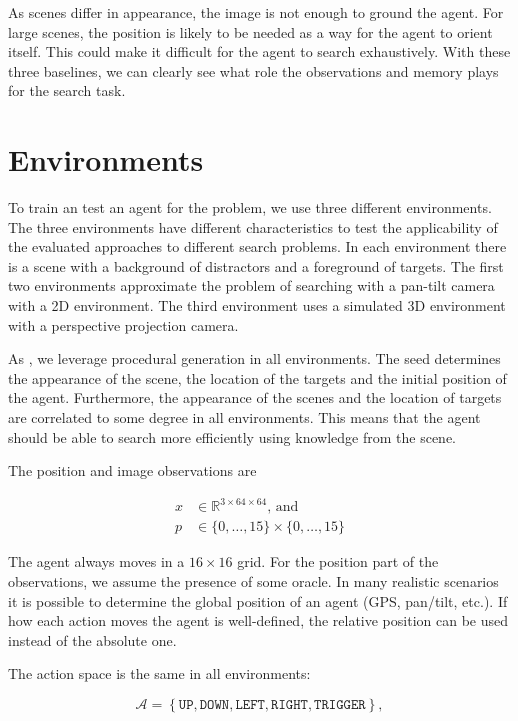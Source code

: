 As scenes differ in appearance, the image is not enough to ground the agent.
For large scenes, the position is likely to be needed as a way for the agent to orient itself.
This could make it difficult for the agent to search exhaustively.
With these three baselines, we can clearly see what role the observations and memory plays for the search task.

\section{Environments}
\label{sec:environments}

To train an test an agent for the problem, we use three different environments.
The three environments have different characteristics to test the applicability of the evaluated approaches to different search problems.
In each environment there is a scene with a background of distractors and a foreground of targets.
The first two environments approximate the problem of searching with a pan-tilt camera with a 2D environment.
The third environment uses a simulated 3D environment with a perspective projection camera. 

As \cite{cobbe_procgen_2020,mnih_asynchronous_2016}, we leverage procedural generation in all environments.
The seed determines the appearance of the scene, the location of the targets and the initial position of the agent.
Furthermore, the appearance of the scenes and the location of targets are correlated to some degree in all environments.
This means that the agent should be able to search more efficiently using knowledge from the scene.

The position and image observations are

\begin{align*}
    x & \in \mathbb{R}^{3 \times 64 \times 64} \text{, and} \\
    p & \in \{0, \dots, 15\} \times \{0, \dots, 15\}
\end{align*}

The agent always moves in a \(16 \times 16\) grid.
For the position part of the observations, we assume the presence of some oracle.
In many realistic scenarios it is possible to determine the global position of an agent (GPS, pan/tilt, etc.).
If how each action moves the agent is well-defined, the relative position can be used instead of the absolute one.

The action space is the same in all environments:

\begin{equation*}
    \mathcal{A} = \left\lbrace \mathtt{UP}, \mathtt{DOWN}, \mathtt{LEFT}, \mathtt{RIGHT}, \mathtt{TRIGGER} \right\rbrace,
\end{equation*}

